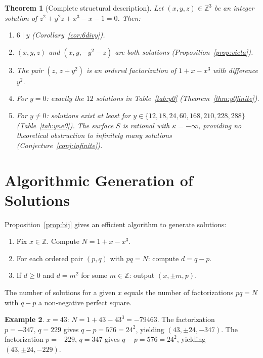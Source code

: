 \documentclass[12pt,a4paper]{article}
\newtheorem{theorem}{Theorem}[section]
\theoremstyle{definition}
\newtheorem{example}[theorem]{Example}
\newcommand{\Z}{\mathbb{Z}}
\begin{document}
\begin{theorem}[Complete structural description]\label{thm:structure}
  Let $(x,y,z)\in\Z^3$ be an integer solution of $z^2+y^2z+x^3-x-1=0$.  Then:
  \begin{enumerate}[label=(\roman*)]
    \item $6\mid y$ (Corollary~\ref{cor:6divy}).
    \item $(x,y,z)$ and $(x,y,-y^2-z)$ are both solutions (Proposition~\ref{prop:vieta}).
    \item The pair $(z,\,z+y^2)$ is an ordered factorization of $1+x-x^3$ with
          difference $y^2$.
    \item For $y=0$: exactly the $12$ solutions in Table~\ref{tab:y0}
          (Theorem~\ref{thm:y0finite}).
    \item For $y\ne 0$: solutions exist at least for $y\in\{12,18,24,60,168,210,228,288\}$
          (Table~\ref{tab:yne0}).  The surface $S$ is rational with
          $\kappa=-\infty$, providing no theoretical obstruction to infinitely many
          solutions (Conjecture~\ref{conj:infinite}).
  \end{enumerate}
\end{theorem}

\section{Algorithmic Generation of Solutions}
\label{sec:algo}

Proposition~\ref{prop:bij} gives an efficient algorithm to generate solutions:

\begin{enumerate}
  \item Fix $x\in\Z$.  Compute $N = 1+x-x^3$.
  \item For each ordered pair $(p,q)$ with $pq=N$: compute $d=q-p$.
  \item If $d\ge 0$ and $d=m^2$ for some $m\in\Z$: output $(x,\pm m, p)$.
\end{enumerate}

The number of solutions for a given $x$ equals the number of factorizations
$pq=N$ with $q-p$ a non-negative perfect square.

\begin{example}
  $x=43$: $N = 1+43-43^3 = -79463$.
  The factorization $p=-347,\,q=229$ gives $q-p=576=24^2$, yielding
  $(43,\pm24,-347)$.  The factorization $p=-229,\,q=347$ gives $q-p=576=24^2$,
  yielding $(43,\pm24,-229)$.
\end{example}
\end{document}
